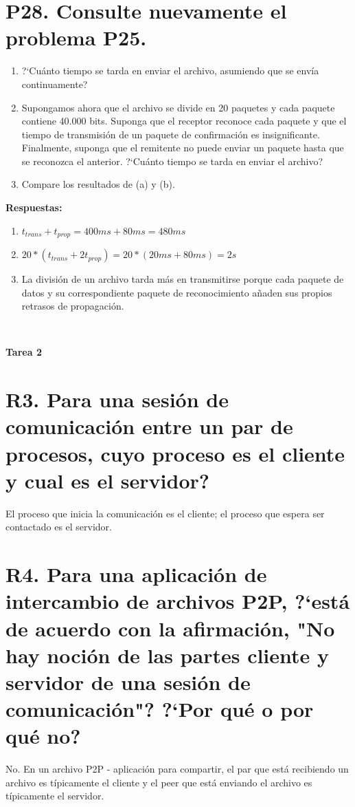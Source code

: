 \documentclass[a4paper, 11pt]{article}
\theoremstyle{definition} \theoremstyle{remark}
\begin{document}
     \section{P28. Consulte nuevamente el problema P25.}
     \renewcommand{\theenumi}{\alph{enumi}}
     \begin{enumerate}
       \item ?`Cu\'anto tiempo se tarda en enviar el archivo, asumiendo que se env\'ia continuamente?
       \item Supongamos ahora que el archivo se divide en 20 paquetes y cada paquete contiene 40.000 bits. Suponga que el receptor reconoce cada paquete y que el tiempo de transmisi\'on de un paquete de confirmaci\'on es insignificante. Finalmente, suponga que el remitente no puede enviar un paquete hasta que se reconozca el anterior. ?`Cu\'anto tiempo se tarda en enviar el archivo?
       \item Compare los resultados de (a) y (b).
     \end{enumerate}
     \textbf{Respuestas:}
     \renewcommand{\theenumi}{\alph{enumi}}
     \begin{enumerate}
       \item $t_{trans}+t_{prop}=400ms+80ms= 480ms$
       \item $20*(t_{trans}+2t_{prop})=20*(20ms+80ms) = 2s$
       \item La divisi\'on de un archivo tarda m\'as en transmitirse porque cada paquete de datos y su correspondiente paquete de reconocimiento a\~{n}aden sus propios retrasos de propagaci\'on.
     \end{enumerate}
     \
     \begin{center}
       \vfill
       \textbf{Tarea 2}
     \end{center}

     \setcounter{section}{0}
     \section{R3. Para una sesi\'on de comunicaci\'on entre un par de procesos, cuyo proceso es el cliente y cual es el servidor?}
     El proceso que inicia la comunicaci\'on es el cliente; el proceso que espera ser contactado es el servidor.

     \section{R4. Para una aplicaci\'on de intercambio de archivos P2P, ?`est\'a de acuerdo con la afirmaci\'on, "No hay noci\'on de las partes cliente y servidor de una sesi\'on de comunicaci\'on"? ?`Por qu\'e o por qu\'e no?}
     No. En un archivo P2P - aplicaci\'on para compartir, el par que est\'a recibiendo un archivo es t\'ipicamente el cliente y el peer que est\'a enviando el archivo es t\'ipicamente el servidor.
\end{document}
